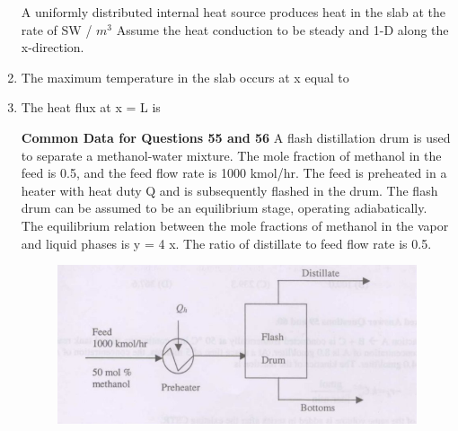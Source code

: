 \documentclass[journal,12pt,onecolumn]{IEEEtran}
\theoremstyle{remark}
\begin{document}
\begin{enumerate}
		A uniformly distributed internal heat source produces heat in the slab at the rate of SW / $m^3$ Assume the heat conduction to be steady and 1-D along the x-direction.
		
		\item The maximum temperature in the slab occurs at x equal to 
		\begin{enumerate}
		\end{enumerate}
		
		\hfill \brak{\text{GATE CH 2009}}
		
		\item The heat flux at x = L is 
		\begin{enumerate}
			\begin{multicols}{4}
				\item 0
				\item S L/4
				\item S L/2
				\item S L
			\end{multicols}
		\end{enumerate}
		
		\hfill {}
		
		
		\textbf{Common Data for Questions 55 and 56}
		A flash distillation drum  is used to separate a methanol-water mixture. The mole fraction of methanol in the feed is 0.5, and the feed flow rate is 1000 kmol/hr. The feed is preheated in a heater with heat duty Q and is subsequently flashed in the drum. The flash drum can be assumed to be an equilibrium stage, operating adiabatically. The equilibrium relation between the mole fractions of methanol in the vapor and liquid phases is y = 4 x. The ratio of distillate to feed flow rate is 0.5.
		\begin{figure}[H]
			\centering
			\includegraphics[width = 0.5\columnwidth]{q55.png}
			\caption{}
			\label{fig:Q55}
		\end{figure}
		

\end{enumerate}
\end{document}
